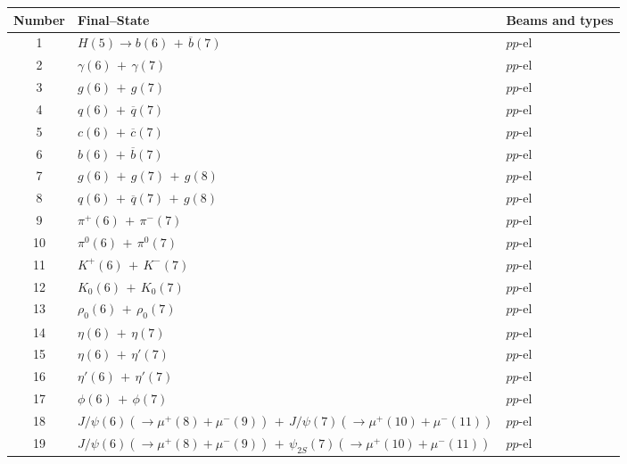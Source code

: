 \documentclass{article}
\begin{document}
\begin{center}\tiny
\begin{tabular}{|c|l|l|}\hline
Number&Final--State& Beams and types\\\hline\hline

1 &  $H(5) \to b(6)\,+\,\overline{b}(7)$ &  $pp$-el  \\

2 &  $\gamma(6)\,+\, \gamma(7)$ &  $pp$-el  \\

3 & $g(6)\,+\, g(7)$ &  $pp$-el  \\

4 & $q(6)\,+\, \overline{q}(7)$ &  $pp$-el  \\

5 & $c(6)\,+\, \overline{c}(7)$ &  $pp$-el  \\

6 & $b(6)\,+\, \overline{b}(7)$ &  $pp$-el  \\

7 & $g(6)\,+\, g(7)\,+\, g(8)$ &  $pp$-el  \\

8 & $q(6)\,+\, \overline{q}(7)\,+\, g(8)$ &  $pp$-el  \\

9 & $\pi^+(6)\,+\,\pi^-(7)$ &  $pp$-el  \\

10 & $ \pi^0(6)\,+\,\pi^0(7)$ &  $pp$-el  \\

11 & $K^+(6)\,+\,K^-(7)$ &  $pp$-el  \\

12 & $K_0(6)\,+\,K_0(7)$ &  $pp$-el  \\

13 & $\rho_0(6)\,+\,\rho_0(7)$ &  $pp$-el  \\

14 & $\eta(6)\,+\,\eta(7)$ &  $pp$-el  \\

15 & $\eta(6)\,+\,\eta'(7)$ &  $pp$-el  \\

16 & $\eta'(6)\,+\,\eta'(7)$ &  $pp$-el  \\

17 & $\phi(6)\,+\,\phi(7)$ &  $pp$-el  \\

18 & $J/\psi(6)(\to \mu^+(8)+\mu^-(9))\,+\,J/\psi(7)(\to \mu^+(10)+\mu^-(11))$ &  $pp$-el  \\

19 & $J/\psi(6)(\to \mu^+(8)+\mu^-(9))\,+\,\psi_{2S}(7)(\to \mu^+(10)+\mu^-(11))$ &  $pp$-el  \\


\end{tabular}
\end{center}
\end{document}
